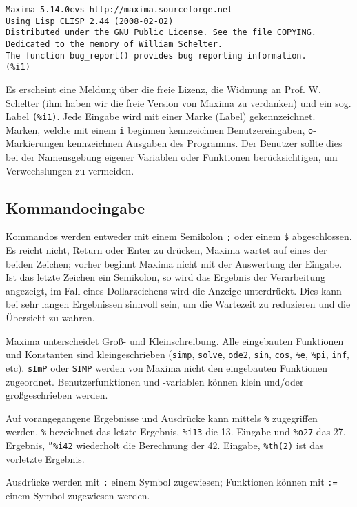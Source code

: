 \documentclass[ngerman,12pt]{scrartcl}
\begin{document}
\begin{verbatim}
Maxima 5.14.0cvs http://maxima.sourceforge.net
Using Lisp CLISP 2.44 (2008-02-02)
Distributed under the GNU Public License. See the file COPYING.
Dedicated to the memory of William Schelter.
The function bug_report() provides bug reporting information.
(%i1)
\end{verbatim}

Es erscheint eine Meldung über die freie Lizenz, die
Widmung an Prof. W. Schelter (ihm haben wir die freie Version
von Maxima zu verdanken) und ein sog. Label \texttt{(\%i1)}. Jede Eingabe
wird mit einer Marke (Label) gekennzeichnet. Marken, welche mit einem
\texttt{i} beginnen kennzeichnen Benutzereingaben, \texttt{o}-Markierungen kennzeichnen
Ausgaben des Programms. Der Benutzer sollte dies bei der Namensgebung
eigener  Variablen oder Funktionen berücksichtigen, um Verwechslungen
zu vermeiden.

\subsection{Kommandoeingabe}

Kommandos werden entweder mit einem Semikolon  \texttt{;}  oder einem
\texttt{\$} abgeschlossen.  Es reicht nicht, Return oder Enter zu
drücken, Maxima wartet auf eines der beiden Zeichen; vorher beginnt
Maxima nicht mit der Auswertung der Eingabe. Ist das letzte Zeichen
ein Semikolon, so wird das Ergebnis der Verarbeitung angezeigt, im
Fall eines Dollarzeichens wird die Anzeige unterdrückt. Dies kann bei
sehr langen Ergebnissen sinnvoll sein, um die Wartezeit zu reduzieren
und die Übersicht zu wahren.

Maxima unterscheidet Groß- und Kleinschreibung. Alle eingebauten
Funktionen und Konstanten sind kleingeschrieben (\texttt{simp},
\texttt{solve}, \texttt{ode2}, \texttt{sin}, \texttt{cos},
\texttt{\%e}, \texttt{\%pi}, \texttt{inf}, etc). \texttt{sImP} oder
\texttt{SIMP} werden von Maxima nicht den eingebauten Funktionen
zugeordnet. Benutzerfunktionen und -variablen können klein und/oder
großgeschrieben  werden.

Auf vorangegangene Ergebnisse und Ausdrücke kann mittels \texttt{\%}
zugegriffen werden. \texttt{\%} bezeichnet das letzte Ergebnis,
\texttt{\%i13} die 13. Eingabe und \texttt{\%o27} das 27. Ergebnis,
\texttt{''\%i42} wiederholt die Berechnung der 42. Eingabe,
\texttt{\%th(2)} ist das vorletzte Ergebnis.

Ausdrücke werden mit \texttt{:} einem Symbol zugewiesen; Funktionen
können mit \texttt{:=} einem Symbol zugewiesen werden.
\end{document}
